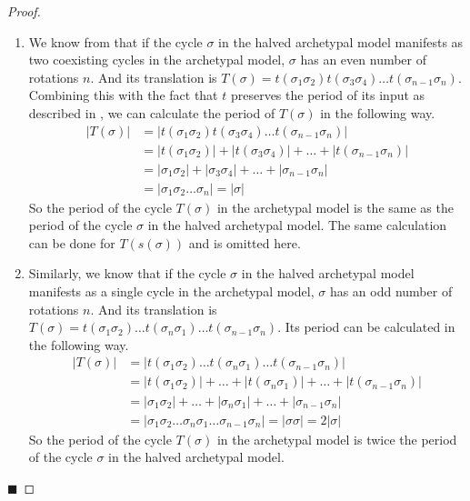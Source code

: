 \begin{proof} \phantom{x}
	\begin{enumerate}
		\item We know from  that if the cycle $\sigma$ in the halved archetypal model manifests as two coexisting cycles in the archetypal model, $\sigma$ has an even number of rotations $n$.
		      And its translation is $T(\sigma) = t(\sigma_1\sigma_2) t(\sigma_3\sigma_4) \dots t(\sigma_{n-1}\sigma_n)$.
		      Combining this with the fact that $t$ preserves the period of its input as described in , we can calculate the period of $T(\sigma)$ in the following way.
		      \begin{align*}
			      |T(\sigma)| & = |t(\sigma_1\sigma_2) t(\sigma_3\sigma_4) \dots t(\sigma_{n-1}\sigma_n)|           \\
			                  & = |t(\sigma_1\sigma_2)| + |t(\sigma_3\sigma_4)| + \dots + |t(\sigma_{n-1}\sigma_n)| \\
			                  & = |\sigma_1\sigma_2| + |\sigma_3\sigma_4| + \dots + |\sigma_{n-1}\sigma_n|          \\
			                  & = |\sigma_1\sigma_2 \dots \sigma_n| = |\sigma|
		      \end{align*}
		      So the period of the cycle $T(\sigma)$ in the archetypal model is the same as the period of the cycle $\sigma$ in the halved archetypal model.
		      The same calculation can be done for $T(s(\sigma))$ and is omitted here.
		\item Similarly, we know that if the cycle $\sigma$ in the halved archetypal model manifests as a single cycle in the archetypal model, $\sigma$ has an odd number of rotations $n$.
		      And its translation is $T(\sigma) = t(\sigma_1\sigma_2) \dots t(\sigma_n\sigma_1) \dots t(\sigma_{n-1}\sigma_n)$.
		      Its period can be calculated in the following way.
		      \begin{align*}
			      |T(\sigma)| & = |t(\sigma_1\sigma_2) \dots t(\sigma_n\sigma_1) \dots t(\sigma_{n-1}\sigma_n)|                      \\
			                  & = |t(\sigma_1\sigma_2)| + \dots + |t(\sigma_n\sigma_1)| + \dots + |t(\sigma_{n-1}\sigma_n)|          \\
			                  & = |\sigma_1\sigma_2| + \dots + |\sigma_n\sigma_1| + \dots + |\sigma_{n-1}\sigma_n|                   \\
			                  & = |\sigma_1\sigma_2 \dots \sigma_n\sigma_1 \dots \sigma_{n-1}\sigma_n| = |\sigma\sigma| = 2 |\sigma|
		      \end{align*}
		      So the period of the cycle $T(\sigma)$ in the archetypal model is twice the period of the cycle $\sigma$ in the halved archetypal model.
	\end{enumerate}
	\hfill $\blacksquare$
\end{proof}

